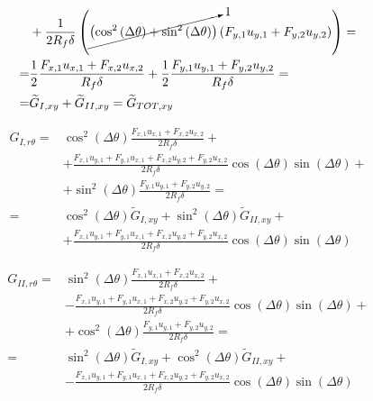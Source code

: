 \documentclass[a4paper]{jpconf}
\begin{document}
\begin{equation}
\begin{split}
&+\frac{1}{2R_{f}\delta}\left(\cancelto{1}{\left(\cos^{2}\left(\Delta\theta\right)+\sin^{2}\left(\Delta\theta\right)\right)}\left(F_{y,1}u_{y,1}+F_{y,2}u_{y,2}\right)\right)=\\
=&\frac{1}{2}\frac{F_{x,1}u_{x,1}+F_{x,2}u_{x,2}}{R_{f}\delta}+\frac{1}{2}\frac{F_{y,1}u_{y,1}+F_{y,2}u_{y,2}}{R_{f}\delta}=\\
=&\widetilde{G}_{I,xy} + \widetilde{G}_{II,xy}=\widetilde{G}_{TOT,xy}
\end{split}
\end{equation}

\begin{equation}
\begin{split}
G_{I,r\theta} = &\cos^{2}\left(\Delta\theta\right)\frac{F_{x,1}u_{x,1}+F_{x,2}u_{x,2}}{2R_{f}\delta}+\\
&+\frac{F_{x,1}u_{y,1}+F_{y,1}u_{x,1}+F_{x,2}u_{y,2}+F_{y,2}u_{x,2}}{2R_{f}\delta}\cos\left(\Delta\theta\right)\sin\left(\Delta\theta\right)+\\
&+\sin^{2}\left(\Delta\theta\right)\frac{F_{y,1}u_{y,1}+F_{y,2}u_{y,2}}{2R_{f}\delta}=\\
=&\cos^{2}\left(\Delta\theta\right)\widetilde{G}_{I,xy}+\sin^{2}\left(\Delta\theta\right)\widetilde{G}_{II,xy}+\\
&+\frac{F_{x,1}u_{y,1}+F_{y,1}u_{x,1}+F_{x,2}u_{y,2}+F_{y,2}u_{x,2}}{2R_{f}\delta}\cos\left(\Delta\theta\right)\sin\left(\Delta\theta\right)
\end{split}
\end{equation}

\begin{equation}
\begin{split}
G_{II,r\theta} = &\sin^{2}\left(\Delta\theta\right)\frac{F_{x,1}u_{x,1}+F_{x,2}u_{x,2}}{2R_{f}\delta}+\\
&-\frac{F_{x,1}u_{y,1}+F_{y,1}u_{x,1}+F_{x,2}u_{y,2}+F_{y,2}u_{x,2}}{2R_{f}\delta}\cos\left(\Delta\theta\right)\sin\left(\Delta\theta\right)+\\
&+\cos^{2}\left(\Delta\theta\right)\frac{F_{y,1}u_{y,1}+F_{y,2}u_{y,2}}{2R_{f}\delta}=\\
=&\sin^{2}\left(\Delta\theta\right)\widetilde{G}_{I,xy}+\cos^{2}\left(\Delta\theta\right)\widetilde{G}_{II,xy}+\\
&-\frac{F_{x,1}u_{y,1}+F_{y,1}u_{x,1}+F_{x,2}u_{y,2}+F_{y,2}u_{x,2}}{2R_{f}\delta}\cos\left(\Delta\theta\right)\sin\left(\Delta\theta\right)
\end{split}
\end{equation}
\end{document}

